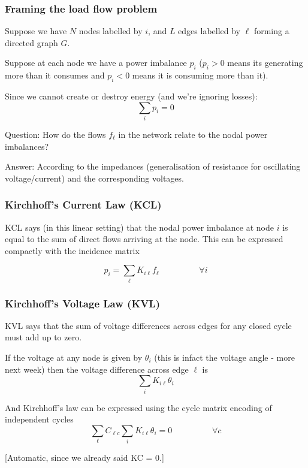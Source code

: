 \documentclass[10pt,dvipsnames]{beamer}
\begin{document}
\begin{frame}
  \frametitle{Framing the load flow problem}

  Suppose we have $N$ nodes labelled by $i$, and $L$ edges labelled by
  $\ell$ forming a directed graph $G$.

  Suppose at each node we have a \alert{power imbalance} $p_i$ ($p_i >
  0$ means its generating more than it consumes and $p_i < 0$ means it
  is consuming more than it).

  Since we cannot create or destroy energy (and we're ignoring losses):
  \begin{equation*}
    \sum_i p_i = 0
  \end{equation*}

  \alert{Question}: How do the flows $f_\ell$ in the network relate to the nodal power
  imbalances?

  \alert{Answer}: According to the impedances (generalisation of
  resistance for oscillating voltage/current) and the corresponding
  voltages.

\end{frame}



\begin{frame}
  \frametitle{Kirchhoff's Current Law (KCL)}

  KCL says (in this linear setting) that the nodal power imbalance at
  node $i$ is equal to the sum of direct flows arriving at the
  node. This can be expressed compactly with the incidence matrix

  \begin{equation*}
    p_i = \sum_\ell K_{i\ell} f_\ell \hspace{2cm} \forall i
  \end{equation*}


\end{frame}


\begin{frame}
  \frametitle{Kirchhoff's Voltage Law (KVL)}

  KVL says that the sum of voltage differences across edges for any
  closed cycle must add up to zero.

  If the voltage at any node is given by $\theta_i$ (this is infact
  the voltage \alert{angle} - more next week) then the voltage difference across edge $\ell$ is
  \begin{equation*}
    \sum_i K_{i\ell} \theta_i
  \end{equation*}

  And Kirchhoff's law can be expressed using the cycle matrix encoding of independent cycles
  \begin{equation*}
    \sum_\ell C_{\ell c} \sum_i K_{i\ell} \theta_i = 0 \hspace{2cm} \forall c
  \end{equation*}

  [Automatic, since we already said KC = 0.]


\end{frame}
\end{document}
